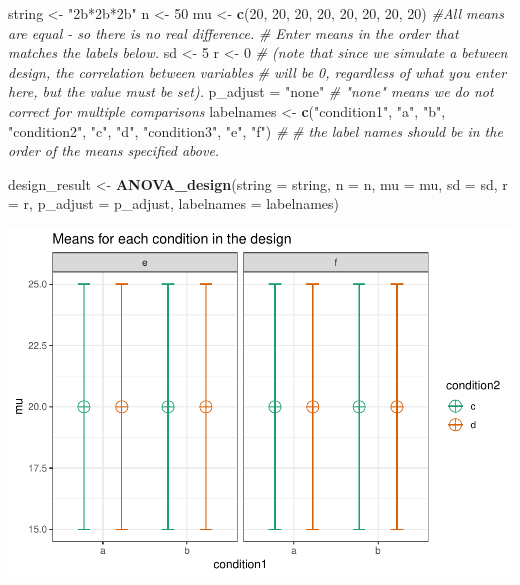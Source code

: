 \documentclass[]{article}
\newenvironment{Shaded}{\begin{snugshade}}{\end{snugshade}}
\newcommand{\KeywordTok}[1]{\textcolor[rgb]{0.13,0.29,0.53}{\textbf{#1}}}
\newcommand{\DataTypeTok}[1]{\textcolor[rgb]{0.13,0.29,0.53}{#1}}
\newcommand{\DecValTok}[1]{\textcolor[rgb]{0.00,0.00,0.81}{#1}}
\newcommand{\StringTok}[1]{\textcolor[rgb]{0.31,0.60,0.02}{#1}}
\newcommand{\CommentTok}[1]{\textcolor[rgb]{0.56,0.35,0.01}{\textit{#1}}}
\newcommand{\NormalTok}[1]{#1}
\begin{document}
\begin{Shaded}
\begin{Highlighting}[]
\NormalTok{string <-}\StringTok{ "2b*2b*2b"}
\NormalTok{n <-}\StringTok{ }\DecValTok{50}
\NormalTok{mu <-}\StringTok{ }\KeywordTok{c}\NormalTok{(}\DecValTok{20}\NormalTok{, }\DecValTok{20}\NormalTok{, }\DecValTok{20}\NormalTok{, }\DecValTok{20}\NormalTok{, }\DecValTok{20}\NormalTok{, }\DecValTok{20}\NormalTok{, }\DecValTok{20}\NormalTok{, }\DecValTok{20}\NormalTok{) }\CommentTok{#All means are equal - so there is no real difference.}
\CommentTok{# Enter means in the order that matches the labels below.}
\NormalTok{sd <-}\StringTok{ }\DecValTok{5}
\NormalTok{r <-}\StringTok{ }\DecValTok{0} 
\CommentTok{# (note that since we simulate a between design, the correlation between variables }
\CommentTok{# will be 0, regardless of what you enter here, but the value must be set).}
\NormalTok{p_adjust =}\StringTok{ "none"}
\CommentTok{# "none" means we do not correct for multiple comparisons}
\NormalTok{labelnames <-}\StringTok{ }\KeywordTok{c}\NormalTok{(}\StringTok{"condition1"}\NormalTok{, }\StringTok{"a"}\NormalTok{, }\StringTok{"b"}\NormalTok{, }\StringTok{"condition2"}\NormalTok{, }\StringTok{"c"}\NormalTok{, }\StringTok{"d"}\NormalTok{, }\StringTok{"condition3"}\NormalTok{, }\StringTok{"e"}\NormalTok{, }\StringTok{"f"}\NormalTok{) }\CommentTok{#}
\CommentTok{# the label names should be in the order of the means specified above.}

\NormalTok{design_result <-}\StringTok{ }\KeywordTok{ANOVA_design}\NormalTok{(}\DataTypeTok{string =}\NormalTok{ string,}
                   \DataTypeTok{n =}\NormalTok{ n, }
                   \DataTypeTok{mu =}\NormalTok{ mu, }
                   \DataTypeTok{sd =}\NormalTok{ sd, }
                   \DataTypeTok{r =}\NormalTok{ r, }
                   \DataTypeTok{p_adjust =}\NormalTok{ p_adjust,}
                   \DataTypeTok{labelnames =}\NormalTok{ labelnames)}
\end{Highlighting}
\end{Shaded}

\includegraphics{4.1_error_control_in_exploratory_ANOVA_files/figure-latex/unnamed-chunk-1-1.pdf}
\end{document}
